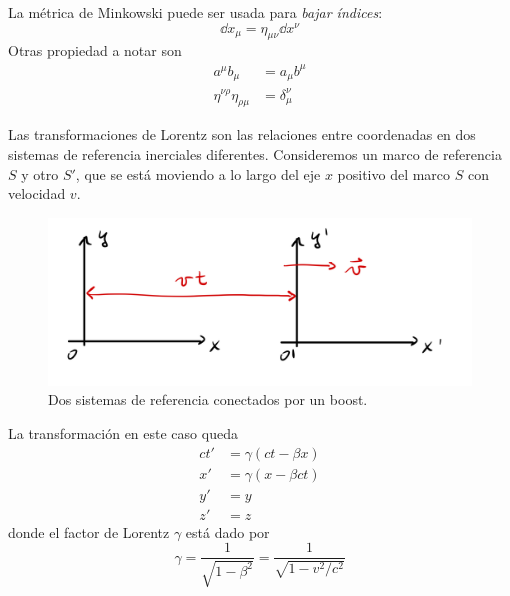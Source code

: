 La métrica de Minkowski puede ser usada para \textit{bajar índices}:
\begin{equation}
    \dd x_\mu=\eta_{\mu\nu}\dd x^\nu
\end{equation}
Otras propiedad a notar son
\begin{align}
    a^\mu b_\mu&=a_\mu b^\mu\\
    \eta^{\nu\rho}\eta_{\rho\mu}&=\delta^\nu_\mu
\end{align}

Las transformaciones de Lorentz son las relaciones entre coordenadas en dos sistemas de referencia inerciales diferentes. Consideremos un marco de referencia $S$ y otro $S'$, que se está moviendo a lo largo del eje $x$ positivo del marco $S$ con velocidad $v$.
\begin{figure}[h!]
    \centering
    \includegraphics[scale=0.1]{cap/img/Lorentz.jpeg}
    \caption{Dos sistemas de referencia conectados por un boost.}
    \label{fig:2.1}
\end{figure}

La transformación en este caso queda
\begin{align}
    ct'&=\gamma(ct-\beta x)\\
    x'&=\gamma(x-\beta ct)\\
    y'&=y\\
    z'&=z
\end{align}
donde el factor de Lorentz $\gamma$ está dado por
\begin{equation}
    \gamma =\frac{1}{\sqrt{1-\beta^2}}=\frac{1}{\sqrt{1-v^2/c^2}}
\end{equation}



